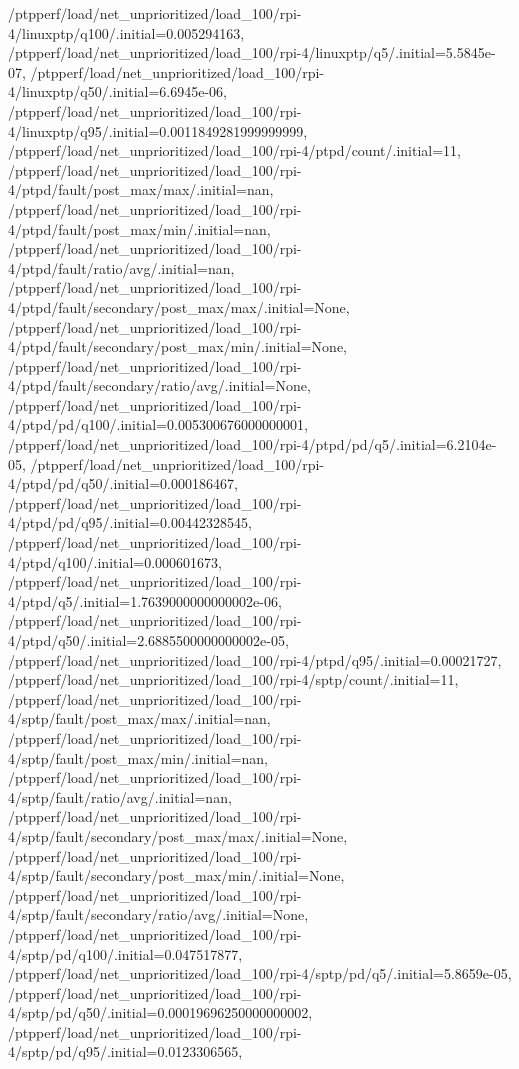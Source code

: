 {    /ptpperf/load/net_unprioritized/load_100/rpi-4/linuxptp/q100/.initial=0.005294163,
    /ptpperf/load/net_unprioritized/load_100/rpi-4/linuxptp/q5/.initial=5.5845e-07,
    /ptpperf/load/net_unprioritized/load_100/rpi-4/linuxptp/q50/.initial=6.6945e-06,
    /ptpperf/load/net_unprioritized/load_100/rpi-4/linuxptp/q95/.initial=0.0011849281999999999,
    /ptpperf/load/net_unprioritized/load_100/rpi-4/ptpd/count/.initial=11,
    /ptpperf/load/net_unprioritized/load_100/rpi-4/ptpd/fault/post_max/max/.initial=nan,
    /ptpperf/load/net_unprioritized/load_100/rpi-4/ptpd/fault/post_max/min/.initial=nan,
    /ptpperf/load/net_unprioritized/load_100/rpi-4/ptpd/fault/ratio/avg/.initial=nan,
    /ptpperf/load/net_unprioritized/load_100/rpi-4/ptpd/fault/secondary/post_max/max/.initial=None,
    /ptpperf/load/net_unprioritized/load_100/rpi-4/ptpd/fault/secondary/post_max/min/.initial=None,
    /ptpperf/load/net_unprioritized/load_100/rpi-4/ptpd/fault/secondary/ratio/avg/.initial=None,
    /ptpperf/load/net_unprioritized/load_100/rpi-4/ptpd/pd/q100/.initial=0.005300676000000001,
    /ptpperf/load/net_unprioritized/load_100/rpi-4/ptpd/pd/q5/.initial=6.2104e-05,
    /ptpperf/load/net_unprioritized/load_100/rpi-4/ptpd/pd/q50/.initial=0.000186467,
    /ptpperf/load/net_unprioritized/load_100/rpi-4/ptpd/pd/q95/.initial=0.00442328545,
    /ptpperf/load/net_unprioritized/load_100/rpi-4/ptpd/q100/.initial=0.000601673,
    /ptpperf/load/net_unprioritized/load_100/rpi-4/ptpd/q5/.initial=1.7639000000000002e-06,
    /ptpperf/load/net_unprioritized/load_100/rpi-4/ptpd/q50/.initial=2.6885500000000002e-05,
    /ptpperf/load/net_unprioritized/load_100/rpi-4/ptpd/q95/.initial=0.00021727,
    /ptpperf/load/net_unprioritized/load_100/rpi-4/sptp/count/.initial=11,
    /ptpperf/load/net_unprioritized/load_100/rpi-4/sptp/fault/post_max/max/.initial=nan,
    /ptpperf/load/net_unprioritized/load_100/rpi-4/sptp/fault/post_max/min/.initial=nan,
    /ptpperf/load/net_unprioritized/load_100/rpi-4/sptp/fault/ratio/avg/.initial=nan,
    /ptpperf/load/net_unprioritized/load_100/rpi-4/sptp/fault/secondary/post_max/max/.initial=None,
    /ptpperf/load/net_unprioritized/load_100/rpi-4/sptp/fault/secondary/post_max/min/.initial=None,
    /ptpperf/load/net_unprioritized/load_100/rpi-4/sptp/fault/secondary/ratio/avg/.initial=None,
    /ptpperf/load/net_unprioritized/load_100/rpi-4/sptp/pd/q100/.initial=0.047517877,
    /ptpperf/load/net_unprioritized/load_100/rpi-4/sptp/pd/q5/.initial=5.8659e-05,
    /ptpperf/load/net_unprioritized/load_100/rpi-4/sptp/pd/q50/.initial=0.00019696250000000002,
    /ptpperf/load/net_unprioritized/load_100/rpi-4/sptp/pd/q95/.initial=0.0123306565,
}

